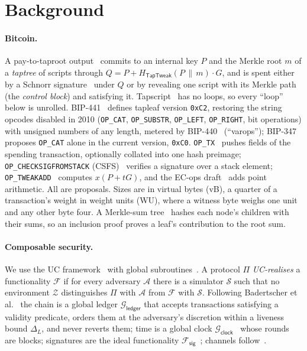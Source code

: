 \documentclass[runningheads]{llncs}
\newif\iffullversion
\newcommand{\op}[1]{\texttt{OP\_#1}}
\newcommand{\Gledger}{\ensuremath{\mathcal{G}_{\mathsf{ledger}}}}
\newcommand{\Gclock}{\ensuremath{\mathcal{G}_{\mathsf{clock}}}}
\newcommand{\Fsig}{\ensuremath{\mathcal{F}_{\mathsf{sig}}}}
\newcommand{\Sim}{\ensuremath{\mathcal{S}}}
\newcommand{\Adv}{\ensuremath{\mathcal{A}}}
\newcommand{\Env}{\ensuremath{\mathcal{Z}}}
\newcommand{\lat}{\ensuremath{\Delta}}
\begin{document}
\section{Background}\label{sec:background}

\paragraph{Bitcoin.}
A pay-to-taproot output~\cite{bip341} commits to an internal key $P$ and
the Merkle root $m$ of a \emph{taptree} of scripts through
$Q = P + H_{\mathsf{TapTweak}}(P \,\|\, m)\cdot G$, and is spent either by
a Schnorr signature~\cite{bip340} under $Q$ or by revealing one script
with its Merkle path (the \emph{control block}) and satisfying it.
Tapscript~\cite{bip342} has no loops, so every ``loop'' below is unrolled.
BIP-441~\cite{bip441} defines tapleaf version \texttt{0xC2}, restoring
the string opcodes disabled in 2010 (\op{CAT}, \op{SUBSTR}, \op{LEFT},
\op{RIGHT}, bit operations) with unsigned numbers of any length, metered
by BIP-440~\cite{bip440} (``varops''); BIP-347~\cite{bip347} proposes
\op{CAT} alone in the current version, \texttt{0xC0}. \op{TX}~\cite{optx}
pushes fields of the spending transaction, optionally collated into one
hash preimage; \op{CHECKSIGFROMSTACK} (CSFS)~\cite{bip348} verifies a
signature over a stack element; \op{TWEAKADD}~\cite{bip449} computes
$x(P + t G)$, and the EC-ops draft~\cite{ecops} adds point arithmetic.
All are proposals. Sizes are in virtual bytes (vB), a quarter of a
transaction's weight in weight units (WU), where a witness byte weighs
one unit and any other byte four. A Merkle-sum tree~\cite{merkle,mssmt}
hashes each node's children with their sums, so an inclusion proof
proves a leaf's contribution to the root sum.

\iffullversion
\paragraph{Composable security.}
We use the UC framework~\cite{canettiUC} with global
subroutines~\cite{guc}. A protocol $\Pi$ \emph{UC-realises} a
functionality $\mathcal{F}$ if for every adversary $\Adv$ there is a
simulator $\Sim$ such that no environment $\Env$ distinguishes $\Pi$ with
$\Adv$ from $\mathcal{F}$ with $\Sim$. Following Badertscher et
al.~\cite{bmtz17} the chain is a global ledger $\Gledger$ that accepts
transactions satisfying a validity predicate, orders them at the
adversary's discretion within a liveness bound $\lat_L$, and never
reverts them; time is a global clock $\Gclock$~\cite{kmtz13} whose rounds
are blocks; signatures are the ideal functionality
$\Fsig$~\cite{canettiSig}; channels follow~\cite{genchannels,gscn}.
\end{document}

